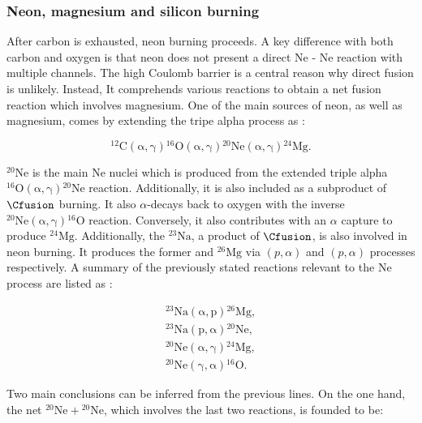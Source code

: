 \documentclass[openany]{book}
\begin{document}
\subsubsection{Neon, magnesium and silicon burning} \label{ssub:reactions_neonMagnesiumSiliconBurning}

After carbon is exhausted, neon burning proceeds. A key difference with both carbon and oxygen is that neon does not present a direct Ne - Ne reaction with multiple channels. The high Coulomb barrier is a central reason why direct fusion is unlikely. Instead, It comprehends various reactions to obtain a net fusion reaction which involves magnesium. One of the main sources of neon, as well as magnesium, comes by extending the tripe alpha process as \cite{kaeppeler_wiescher_giesen_goerres_baraffe_eleid_raiteri_busso_gallino_limongi_et_1994}:

\begin{equation}\label{eq:reaction_4chain}
	\mathrm{{}^{12}C(\alpha, \gamma){}^{16}O(\alpha, \gamma){}^{20}Ne(\alpha, \gamma){}^{24}Mg.}
\end{equation}

$\mathrm{{}^{20}Ne}$ is the main Ne nuclei which is produced from the extended triple alpha $\mathrm{{}^{16}O(\alpha, \gamma){}^{20}Ne}$ reaction. Additionally, it is also included as a subproduct of $\Cfusion$ burning. It also $\alpha$-decays back to oxygen with the inverse $\mathrm{{}^{20}Ne(\alpha, \gamma){}^{16}O}$ reaction. Conversely, it also contributes with an $\alpha$ capture to produce $\mathrm{{}^{24}Mg}$. Additionally, the $\mathrm{{}^{23}Na}$, a product of $\Cfusion$, is also involved in neon burning. It produces the former and $\mathrm{{}^{26}Mg}$ via $(p, \alpha)$ and $(p, \alpha)$ processes respectively. A summary of the previously stated reactions relevant to the Ne process are listed as \cite{arnett_1974}:

\begin{equation}\label{eq:reaction_neon_processes}
	\begin{split}
		\mathrm{{}^{23}Na(\alpha, p){}^{26}Mg}, \\
		\mathrm{{}^{23}Na(p, \alpha){}^{20}Ne}, \\
		\mathrm{{}^{20}Ne(\alpha, \gamma){}^{24}Mg}, \\ 
		\mathrm{{}^{20}Ne(\gamma, \alpha){}^{16}O}.
	\end{split}
\end{equation}

Two main conclusions can be inferred from the previous lines. On the one hand, the net $\mathrm{{}^{20}Ne + {}^{20}Ne}$, which involves the last two reactions, is founded to be: 
\end{document}
